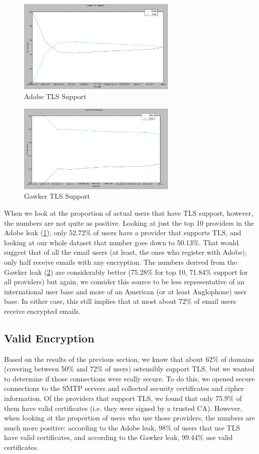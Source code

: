 \begin{figure}
    \includegraphics[width=3.0in]{images/adobe_tls.png}
    \caption{Adobe TLS Support}
    \label{adobe_tls}
\end{figure}

\begin{figure}
    \includegraphics[width=3.0in]{images/gawker_tls.png}
    \caption{Gawker TLS Support}
    \label{gawker_tls}
\end{figure}

When we look at the proportion of actual users that have TLS support, however, 
the numbers are not quite as positive.  Looking at just the top 10 providers in
the Adobe leak (\ref{adobe_tls}), only 52.72\% of users have a provider that supports TLS, and
looking at our whole dataset that number goes down to 50.13\%.  That would
suggest that of all the email users (at least, the ones who register with Adobe),
only half receive emails with any encryption.  The numbers derived from the
Gawker leak (\ref{gawker_tls}) are considerably better (75.28\% for top 10, 71.84\% support for all
providers) but again, we consider this source to be less representative of an
international user base and more of an American (or at least Anglophone) user
base.  In either case, this still implies that at most about 72\% of email users
receive encrypted emails.

\subsection{Valid Encryption}
Based on the results of the previous section, we know that about 62\% of domains 
(covering between 50\% and 72\% of users) ostensibly support TLS, but we wanted to 
determine if those connections were really secure.  To do this, we opened secure 
connections to the SMTP servers and collected security certificates and cipher 
information.  Of the providers that support TLS, we found that only 75.9\% of 
them have valid certificates (i.e. they were signed by a trusted CA).  However, 
when looking at the proportion of users who use those providers, the numbers are 
much more positive: according to the Adobe leak, 98\% of users that use TLS have 
valid certificates, and according to the Gawker leak, 99.44\% use valid 
certificates.

